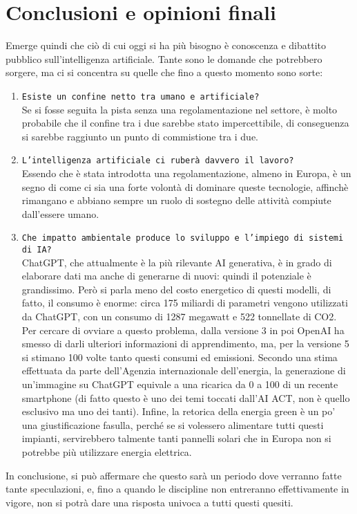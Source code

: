 \documentclass{article}
\begin{document}
\centering
\section{Conclusioni e opinioni finali}
\begin{justify}
   Emerge quindi che ciò di cui oggi si ha più bisogno è conoscenza e dibattito pubblico sull'intelligenza artificiale. Tante sono le domande che potrebbero sorgere, ma ci si concentra su quelle che fino a questo momento sono sorte:
   \begin{enumerate}
       \item \texttt{Esiste un confine netto tra umano e artificiale?}\\
       Se si fosse seguita la pista senza una regolamentazione nel settore, è molto probabile che il confine tra i due sarebbe stato impercettibile, di conseguenza si sarebbe raggiunto un punto di commistione tra i due.
       \item \texttt{L’intelligenza artificiale ci ruberà davvero il lavoro?}\\
       Essendo che è stata introdotta una regolamentazione, almeno in Europa, è un segno di come ci sia una forte volontà di dominare queste tecnologie, affinchè rimangano e abbiano sempre un ruolo di sostegno delle attività compiute dall'essere umano.
       \item \texttt{Che impatto ambientale produce lo sviluppo e l'impiego di sistemi di IA?}\\
       ChatGPT, che attualmente è la più rilevante AI generativa, è in grado di elaborare dati ma anche di generarne di nuovi: quindi il potenziale è grandissimo. Però si parla meno del costo energetico di questi modelli, di fatto, il consumo è enorme: circa 175 miliardi di parametri vengono utilizzati da ChatGPT, con un consumo di 1287 megawatt e 522 tonnellate di CO2. Per cercare di ovviare a questo problema, dalla versione 3 in poi OpenAI ha smesso di darli ulteriori informazioni di apprendimento, ma, per la versione 5 si stimano 100 volte tanto questi consumi ed emissioni.
       Secondo una stima effettuata da parte dell'Agenzia internazionale dell'energia, la generazione di un’immagine su ChatGPT equivale a una ricarica da 0 a 100 di un recente smartphone (di fatto questo è uno dei temi toccati dall’AI ACT, non è quello esclusivo ma uno dei tanti).
       Infine, la retorica della energia green è un po’ una giustificazione fasulla, perché se si volessero alimentare tutti questi impianti, servirebbero talmente tanti pannelli solari che in Europa non si potrebbe più utilizzare energia elettrica.\citep{nast_se_2023}
   \end{enumerate}
   In conclusione, si può affermare che questo sarà un periodo dove verranno fatte tante speculazioni, e, fino a quando le discipline non entreranno effettivamente in vigore, non si potrà dare una risposta univoca a tutti questi quesiti.
\end{justify}

\newpage\begin{justify}
    
    
\end{justify}
\end{document}
